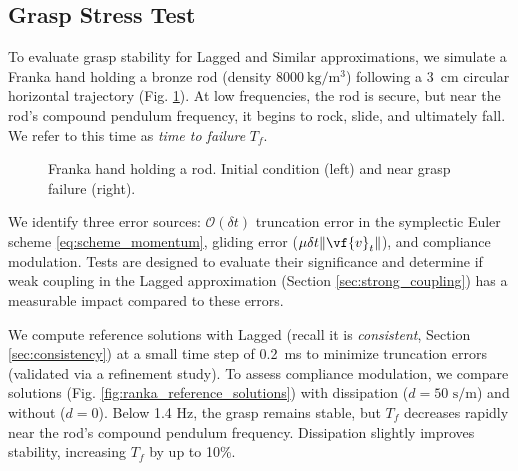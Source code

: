 \subsection{Grasp Stress Test}
\label{sec:franka_hand}

To evaluate grasp stability for Lagged and Similar approximations, we simulate a
Franka hand holding a bronze rod (density $8000~\text{kg}/\text{m}^3$) following
a 3~cm circular horizontal trajectory (Fig. \ref{fig:franka_snapshots}). At low
frequencies, the rod is secure, but near the rod's compound pendulum
frequency, it begins to rock, slide, and ultimately fall. We refer to this
time as \emph{time to failure} $T_f$.

\begin{figure}[!h]
    \centering
    \caption{\label{fig:franka_snapshots} Franka hand holding a rod. Initial condition (left)
    and near grasp failure (right).}
\end{figure}

We identify three error sources: $\mathcal{O}(\delta t)$ truncation error in the
symplectic Euler scheme \eqref{eq:scheme_momentum}, gliding error ($\mu\delta
t\Vert\vf{v}_t\Vert$), and compliance modulation. Tests are designed to evaluate
their significance and determine if weak coupling in the Lagged approximation
(Section \ref{sec:strong_coupling}) has a measurable impact compared to these
errors.

We compute reference solutions with Lagged (recall it is \emph{consistent}, Section
\ref{sec:consistency}) at a small time step of 0.2~ms to minimize truncation
errors (validated via a refinement study). To assess compliance modulation, we
compare solutions (Fig. \ref{fig:ranka_reference_solutions}) with dissipation
($d=50\text{ s/m}$) and without ($d=0$). Below 1.4 Hz, the grasp remains stable,
but $T_f$ decreases rapidly near the rod's compound pendulum frequency.
Dissipation slightly improves stability, increasing $T_f$ by up to 10\%.

